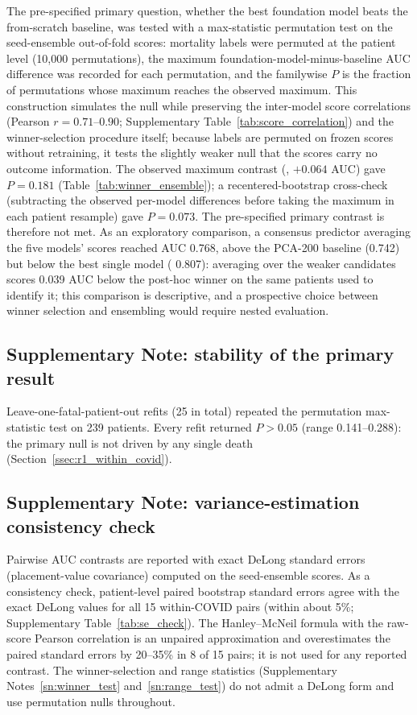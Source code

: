 The pre-specified primary question, whether the best foundation model beats
the from-scratch baseline, was tested with a max-statistic permutation test on
the seed-ensemble out-of-fold scores: mortality labels were permuted at the
patient level (10{,}000 permutations), the maximum
foundation-model-minus-baseline AUC difference was recorded for each
permutation, and the familywise $P$ is the fraction of permutations whose
maximum reaches the observed maximum. This construction simulates the null
while preserving the inter-model score correlations (Pearson $r = 0.71$--$0.90$;
Supplementary Table~\ref{tab:score_correlation}) and the winner-selection
procedure itself; because labels are permuted on frozen scores without
retraining, it tests the slightly weaker null that the scores carry no
outcome information. The observed maximum contrast (,
$+0.064$ AUC) gave $P = 0.181$ (Table~\ref{tab:winner_ensemble}); a
recentered-bootstrap cross-check (subtracting the observed per-model
differences before taking the maximum in each patient resample) gave
$P = 0.073$. The pre-specified primary contrast is therefore not met. As an
exploratory comparison, a consensus predictor averaging the five models'
scores reached AUC 0.768, above the PCA-200 baseline (0.742) but below the
best single model ( 0.807): averaging over the weaker
candidates scores 0.039 AUC below the post-hoc winner on the same patients
used to identify it; this comparison is descriptive, and a prospective choice
between winner selection and ensembling would require nested evaluation.

\subsection{Supplementary Note: stability of the primary result}
\label{sn:fragility}

Leave-one-fatal-patient-out refits (25 in total) repeated the permutation
max-statistic test on 239 patients. Every refit returned $P > 0.05$ (range
0.141--0.288): the primary null is not driven by any single death
(Section~\ref{ssec:r1_within_covid}).

\subsection{Supplementary Note: variance-estimation consistency check}
\label{sn:se_check}

Pairwise AUC contrasts are reported with exact DeLong standard errors
(placement-value covariance) computed on the seed-ensemble scores. As a
consistency check, patient-level paired bootstrap standard errors agree with
the exact DeLong values for all 15 within-COVID pairs (within about 5\%;
Supplementary Table~\ref{tab:se_check}). The Hanley--McNeil formula with the
raw-score Pearson correlation is an unpaired approximation and overestimates
the paired standard errors by 20--35\% in 8 of 15 pairs; it is not used for
any reported contrast. The winner-selection and range statistics
(Supplementary Notes~\ref{sn:winner_test} and~\ref{sn:range_test}) do not
admit a DeLong form and use permutation nulls throughout.


